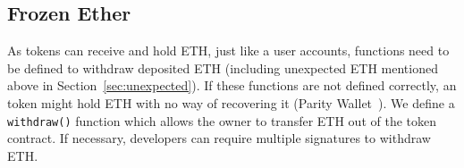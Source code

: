 \subsection{Frozen Ether}

As \erc tokens can receive and hold ETH, just like a user accounts, functions need to be defined to withdraw deposited ETH (including unexpected ETH mentioned above in Section~\ref{sec:unexpected}). If these functions are not defined correctly, an \erc token might hold ETH with no way of recovering it (\cf Parity Wallet~\cite{ParityWalletHack}). We define a \texttt{withdraw()} function which allows the owner to transfer ETH out of the token contract. If necessary, developers can require multiple signatures to withdraw ETH.

%

%

